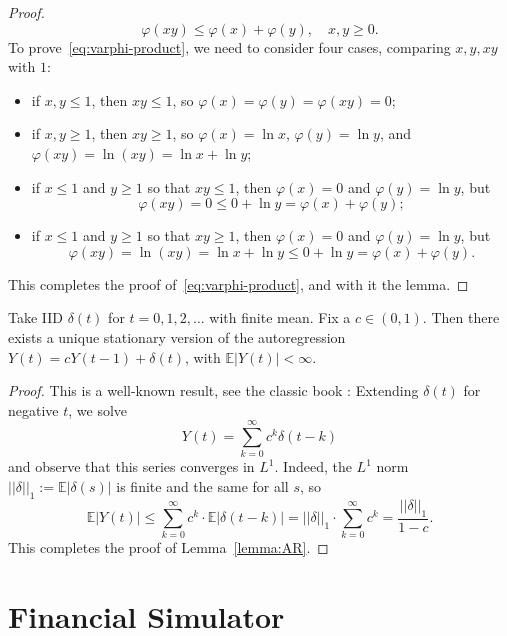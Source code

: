 \documentclass[12pt]{amsart}
\begin{document}
\begin{proof}
\begin{equation}
\label{eq:varphi-product}
\varphi(xy) \le \varphi(x) + \varphi(y),\quad x, y \ge 0.
\end{equation}
To prove~\eqref{eq:varphi-product}, we need to consider four cases, comparing $x, y, xy$ with $1$: 
\begin{itemize}
\item if $x, y \le 1$, then $xy \le 1$, so $\varphi(x) = \varphi(y) = \varphi(xy) = 0$;
\item if $x, y \ge 1$, then $xy \ge 1$, so $\varphi(x) = \ln x$, $\varphi(y) = \ln y$, and $\varphi(xy) = \ln(xy) = \ln x + \ln y$;
\item if $x \le 1$ and $y \ge 1$ so that $xy \le 1$, then $\varphi(x) = 0$ and $\varphi(y) = \ln y$, but 
$$
\varphi(xy) = 0 \le 0 + \ln y = \varphi(x) + \varphi(y); 
$$
\item if $x \le 1$ and $y \ge 1$ so that $xy \ge 1$, then $\varphi(x) = 0$ and $\varphi(y) = \ln y$, but 
$$
\varphi(xy) = \ln(xy) = \ln x + \ln y \le 0 + \ln y = \varphi(x) + \varphi(y).
$$
\end{itemize}
This completes the proof of~\eqref{eq:varphi-product}, and with it the lemma.
\end{proof}

\begin{lemma} Take IID $\delta(t)$ for $t = 0, 1, 2, \ldots$ with finite mean. Fix a $c \in (0, 1)$. Then there exists a unique stationary version of the autoregression $Y(t) = cY(t-1) + \delta(t)$, with $\mathbb E|Y(t)| < \infty$. 
\label{lemma:AR}
\end{lemma}

\begin{proof} This is a well-known result, see the classic book \cite{Series}: Extending $\delta(t)$ for negative $t$, we solve
$$
Y(t) = \sum_{k = 0}^{\infty}c^k\delta(t-k)
$$
and observe that this series converges in $L^1$. Indeed, the $L^1$ norm 
$|\!|\delta|\!|_1 := \mathbb E|\delta(s)|$ is finite and the same for all $s$, so 
$$
\mathbb E|Y(t)| \le \sum\limits_{k=0}^{\infty}c^k\cdot\mathbb E|\delta(t-k)| = |\!|\delta|\!|_1\cdot\sum\limits_{k=0}^{\infty}c^k = \frac{|\!|\delta|\!|_1}{1-c}.
$$
This completes the proof of Lemma~\ref{lemma:AR}.
\end{proof}



\section{Financial Simulator} 
\end{document}
